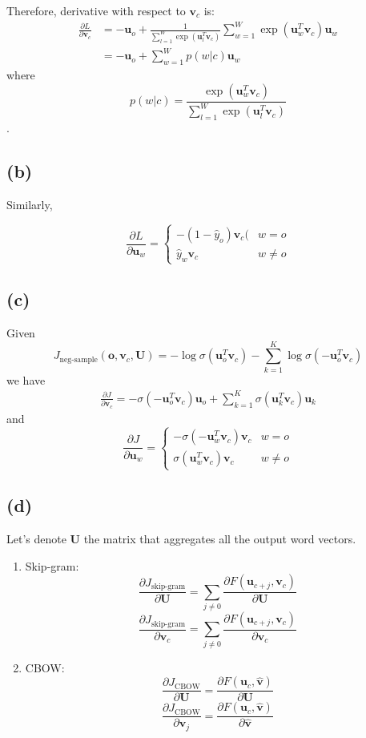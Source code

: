 \documentclass[12pt]{article}
\begin{document}
Therefore, derivative with respect to $\bm v_c$ is:
\begin{align*}
\frac{\partial L}{\partial \bm v_c} &= -\bm u_o + \frac{1}{\sum_{l=1}^{W} \exp( \bm u_l^T \bm v_c)} \sum_{w=1}^{W} \exp(\bm u_w^T \bm v_c) \bm u_w \\
&= -\bm u_o + \sum_{w=1}^W p(w|c) \bm u_w
\end{align*}
where $$p(w|c) = \frac{\exp(\bm u_w^T \bm v_c)}{\sum_{l=1}^{W} \exp( \bm u_l^T \bm v_c)}$$.


\subsection*{(b)}
Similarly,

$$
\frac{\partial L}{\partial \bm u_w} = \begin{cases}
						- (1 - \hat y_o)\bm v_c ( & w =o \\
						\hat y_w \bm v_c  & w \neq o
						     \end{cases}
$$

\subsection*{(c)}
Given $$J_{\text{neg-sample}}(\bm o, \bm v_c, \bm U) = -\log \sigma (\bm u_o^T \bm v_c) - \sum_{k=1}^K \log \sigma (-\bm u_o^T \bm v_c) $$
we have 
\begin{align*}
\frac{\partial J}{\partial \bm v_c} = - \sigma (-\bm u_o^T \bm v_c) \bm u_o + \sum_{k=1}^K \sigma(\bm u_k^T \bm v_c) \bm u_k
\end{align*}
and
$$
\frac{\partial J}{\partial \bm u_w} = \begin{cases}
					-\sigma(-\bm u_w^T \bm v_c)\bm v_c & w = o \\
					\sigma(\bm u_w^T \bm v_c)\bm v_c & w \neq o
					\end{cases}
$$

\subsection*{(d)}
Let's denote $\bm U$ the matrix that aggregates all the output word vectors. 

\begin{enumerate}
\item Skip-gram: 
	$$\frac{\partial J_\text{skip-gram}}{\partial \bm U} = \sum_{j\neq0} \frac{\partial F(\bm u_{c+j}, \bm v_c)}{\partial \bm U}$$ 
	$$\frac{\partial J_\text{skip-gram}}{\partial \bm v_c} =  \sum_{j\neq0} \frac{\partial F(\bm u_{c+j}, \bm v_c)}{\partial \bm v_c}$$
\item CBOW: 
	$$\frac{\partial J_\text{CBOW}}{\partial \bm U} = \frac{\partial F(\bm u_{c}, \bm{\hat v})}{\partial \bm U}$$
	$$\frac{\partial J_\text{CBOW}}{\partial \bm v_j} = \frac{\partial F(\bm u_{c}, \bm{\hat v})}{\partial \bm{\hat v}}$$ 
\end{enumerate}
\end{document}
